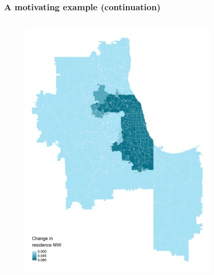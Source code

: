 \documentclass[aspectratio=169, t]{beamer}
\begin{document}
\begin{frame}[label = chi_example]
\frametitle{A motivating example (continuation)}
    \vspace{-6mm}
    \begin{columns}
        \begin{column}{0.50\textwidth}
            \vspace{-4mm}
            \begin{figure}
                \centering
                \includegraphics[scale = 0.35]{maps_events/output/chicago_2019-6_statutory_mw.png}
            \end{figure}   
        \end{column}
        \begin{column}{0.50\textwidth}
            \vspace{-4mm}
            \begin{figure}
                \centering

\end{figure}
\end{column}
\end{columns}
\end{frame}
\end{document}
